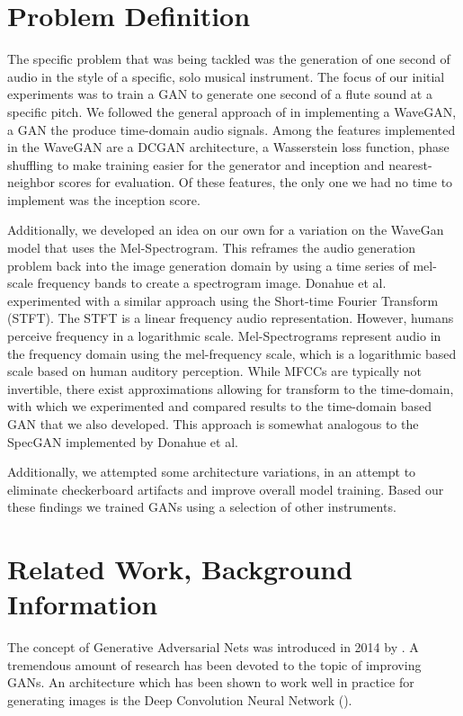 \section{Problem Definition}
The specific problem that was being tackled was the generation of one second of audio in the style of a specific, solo musical instrument. The focus of our initial experiments was to train a GAN to generate one second of a flute sound at a specific pitch. We followed the general approach of \cite{donahue2018adversarial} in implementing a WaveGAN, a GAN the produce time-domain audio signals. Among the features implemented in the WaveGAN are a DCGAN architecture, a Wasserstein loss function, phase shuffling to make training easier for the generator and inception and nearest-neighbor scores for evaluation. Of these features, the only one we had no time to implement was the inception score. 

Additionally, we developed an idea on our own for a variation on the WaveGan model that uses the Mel-Spectrogram. This reframes the audio generation problem back into the image generation domain by using a time series of mel-scale frequency bands to create a spectrogram image. Donahue et al. experimented with a similar approach using the Short-time Fourier Transform (STFT). The STFT is a linear frequency audio representation. However, humans perceive frequency in a logarithmic scale. Mel-Spectrograms represent audio in the frequency domain using the mel-frequency scale, which is a logarithmic based scale based on human auditory perception. While MFCCs are typically not invertible, there exist approximations allowing for transform to the time-domain, with which we experimented and compared results to the time-domain based GAN that we also developed. This approach is somewhat analogous to the SpecGAN implemented by Donahue et al.

Additionally, we attempted some architecture variations, in an attempt to eliminate checkerboard artifacts and improve overall model training. Based our these findings we trained GANs using a selection of other instruments.

\section{Related Work, Background Information}

The concept of Generative Adversarial Nets was introduced in 2014 by \cite{goodfellow2014generative}. A tremendous amount of research has been devoted to the topic of improving GANs. An architecture which has been shown to work well in practice for generating images is the Deep Convolution Neural Network (\cite{radford2015unsupervised}).

